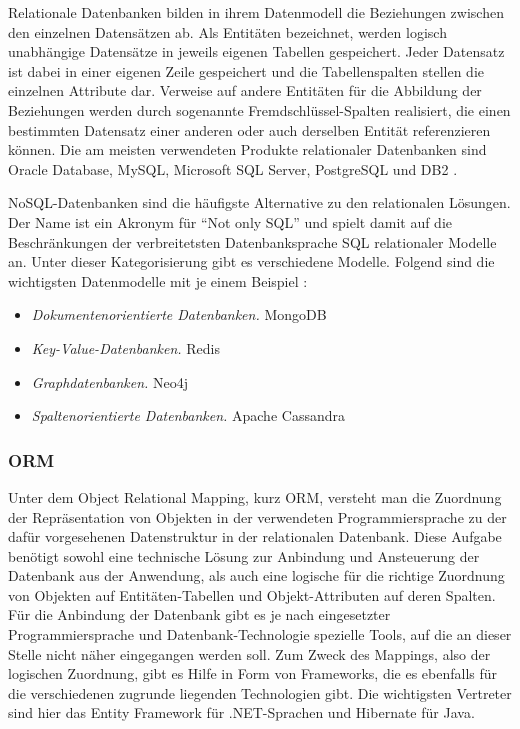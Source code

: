 Relationale Datenbanken bilden in ihrem Datenmodell die Beziehungen zwischen den einzelnen Datensätzen ab.
Als Entitäten bezeichnet, werden logisch unabhängige Datensätze in jeweils eigenen Tabellen gespeichert. Jeder Datensatz ist dabei in einer eigenen Zeile gespeichert und die Tabellenspalten stellen die einzelnen Attribute dar.
Verweise auf andere Entitäten für die Abbildung der Beziehungen werden durch sogenannte Fremdschlüssel-Spalten realisiert, die einen bestimmten Datensatz einer anderen oder auch derselben Entität referenzieren können.
Die am meisten verwendeten Produkte relationaler Datenbanken sind Oracle Database, MySQL, Microsoft SQL Server, PostgreSQL und DB2 \cite{solidIT2017}.

\acs{NoSQL}-Datenbanken sind die häufigste Alternative zu den relationalen Lösungen. Der Name ist ein Akronym für \enquote{Not only SQL} und spielt damit auf die Beschränkungen der verbreitetsten Datenbanksprache \acs{SQL} relationaler Modelle an.
Unter dieser Kategorisierung gibt es verschiedene Modelle. Folgend sind die wichtigsten Datenmodelle mit je einem Beispiel \cite{solidIT2017a}:

\begin{itemize}
\item\textit{Dokumentenorientierte Datenbanken.} MongoDB
\item\textit{Key-Value-Datenbanken.} Redis
\item\textit{Graphdatenbanken.} Neo4j
\item\textit{Spaltenorientierte Datenbanken.} Apache Cassandra
\end{itemize}

\subsubsection{ORM}
Unter dem Object Relational Mapping, kurz \acs{ORM}, versteht man die Zuordnung der Repräsentation von Objekten in der verwendeten Programmiersprache zu der dafür vorgesehenen Datenstruktur in der relationalen Datenbank.
Diese Aufgabe benötigt sowohl eine technische Lösung zur Anbindung und Ansteuerung der Datenbank aus der Anwendung, als auch eine logische für die richtige Zuordnung von Objekten auf Entitäten-Tabellen und Objekt-Attributen auf deren Spalten.
Für die Anbindung der Datenbank gibt es je nach eingesetzter Programmiersprache und Datenbank-Technologie spezielle Tools, auf die an dieser Stelle nicht näher eingegangen werden soll.
Zum Zweck des Mappings, also der logischen Zuordnung, gibt es Hilfe in Form von Frameworks, die es ebenfalls für die verschiedenen zugrunde liegenden Technologien gibt.
Die wichtigsten Vertreter sind hier das Entity Framework für .NET-Sprachen und Hibernate für Java.

